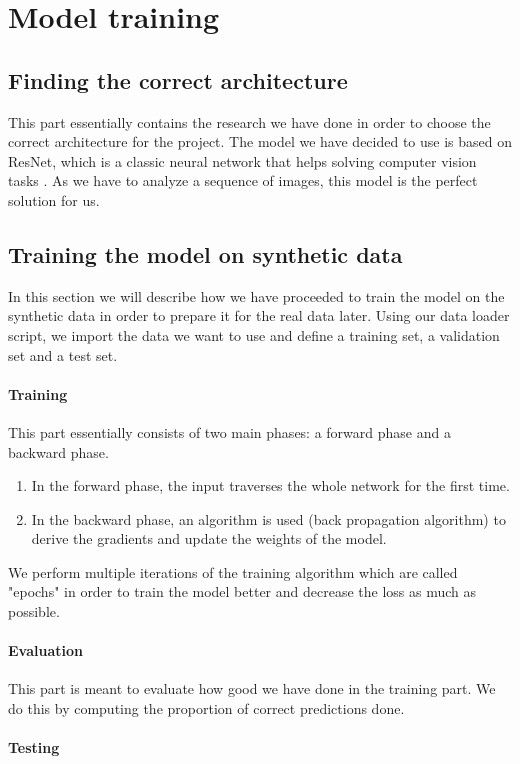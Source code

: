 \documentclass[10pt,conference]{IEEEtran}
\begin{document}
\section{Model training}
\subsection{Finding the correct architecture}
This part essentially contains the research we have done in order to choose the correct architecture for the project. The model we have decided to use is based on ResNet, which is a classic neural network that helps solving computer vision tasks \cite{hara3dcnns}. As we have to analyze a sequence of images, this model is the perfect solution for us.

\subsection{Training the model on synthetic data}
In this section we will describe how we have proceeded to train the model on the synthetic data in order to prepare it for the real data later. Using our data loader script, we import the data we want to use and define a training set, a validation set and a test set.
\paragraph{Training} This part essentially consists of two main phases: a forward phase and a backward phase.
\begin{enumerate}
  \item In the forward phase, the input traverses the whole network for the first time.
  \item In the backward phase, an algorithm is used (back propagation algorithm) to derive the gradients and update the weights of the model.
\end{enumerate}
We perform multiple iterations of the training algorithm which are called "epochs" in order to train the model better and decrease the loss as much as possible.
\paragraph{Evaluation} This part is meant to evaluate how good we have done in the training part. We do this by computing the proportion of correct predictions done.
\paragraph{Testing} %
\end{document}
